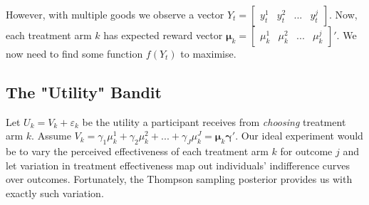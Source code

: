 \documentclass{article}
\begin{document}
However, with multiple goods we observe a  vector  $Y_t = \begin{bmatrix} y^1_t & y^2_t & ... & y^j_t\end{bmatrix}$.
Now, each treatment arm $k$ has expected reward vector $\bm{\mu}_k = \begin{bmatrix}
    \mu^1_k & \mu^2_k & ... & \mu^j_k
\end{bmatrix}'$. We now need to find some function $f(Y_t)$ to maximise. 

\subsection*{The "Utility" Bandit}

Let $U_k = V_k + \varepsilon_k$ be the utility a 
participant receives from \textit{choosing} treatment arm $k$. Assume $V_k = 
\gamma_1 \mu^1_k + \gamma_2 \mu^2_k + ... + \gamma_J \mu^J_k = \bm{\mu}_k\bm{\gamma}'$. Our ideal experiment would be to vary the perceived effectiveness of each treatment arm $k$ for 
outcome $j$ and let variation in treatment effectiveness map out individuals' 
indifference curves over outcomes. Fortunately, the Thompson sampling posterior 
provides us with exactly such variation. 
\end{document}
